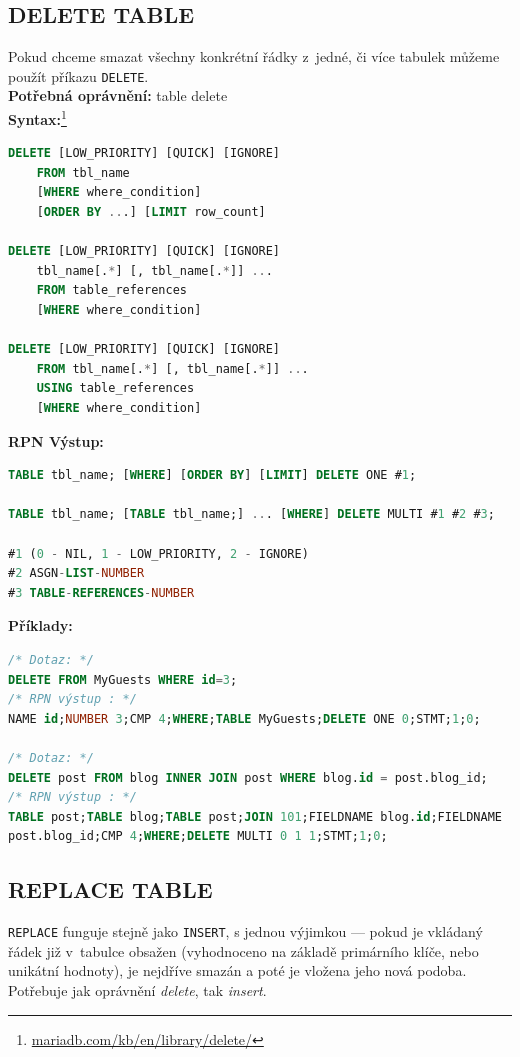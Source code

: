 \subsection{DELETE TABLE} \label{subsec:6:deletetbl}
Pokud chceme smazat všechny konkrétní řádky z~jedné, či více tabulek můžeme použít příkazu \texttt{DELETE}. \\

\textbf{Potřebná oprávnění:} table delete \\

\textbf{Syntax:}\footnote{\url{mariadb.com/kb/en/library/delete/}}
\begin{lstlisting}[language=sql]
DELETE [LOW_PRIORITY] [QUICK] [IGNORE] 
    FROM tbl_name 
    [WHERE where_condition]
    [ORDER BY ...] [LIMIT row_count]

DELETE [LOW_PRIORITY] [QUICK] [IGNORE]
    tbl_name[.*] [, tbl_name[.*]] ...
    FROM table_references
    [WHERE where_condition]

DELETE [LOW_PRIORITY] [QUICK] [IGNORE]
    FROM tbl_name[.*] [, tbl_name[.*]] ...
    USING table_references
    [WHERE where_condition]
\end{lstlisting}
\vspace*{\baselineskip}
\textbf{RPN Výstup:}
\begin{lstlisting}[language=sql]
TABLE tbl_name; [WHERE] [ORDER BY] [LIMIT] DELETE ONE #1;

TABLE tbl_name; [TABLE tbl_name;] ... [WHERE] DELETE MULTI #1 #2 #3;

#1 (0 - NIL, 1 - LOW_PRIORITY, 2 - IGNORE)
#2 ASGN-LIST-NUMBER
#3 TABLE-REFERENCES-NUMBER
\end{lstlisting}
\vspace*{\baselineskip}
\textbf{Příklady:}
\begin{lstlisting}[language=sql]
/* Dotaz: */
DELETE FROM MyGuests WHERE id=3;
/* RPN výstup : */
NAME id;NUMBER 3;CMP 4;WHERE;TABLE MyGuests;DELETE ONE 0;STMT;1;0;

/* Dotaz: */
DELETE post FROM blog INNER JOIN post WHERE blog.id = post.blog_id;
/* RPN výstup : */
TABLE post;TABLE blog;TABLE post;JOIN 101;FIELDNAME blog.id;FIELDNAME 
post.blog_id;CMP 4;WHERE;DELETE MULTI 0 1 1;STMT;1;0;
\end{lstlisting}

\subsection{REPLACE TABLE} \label{subsec:6:replacetbl}
\texttt{REPLACE} funguje stejně jako \texttt{INSERT}, s jednou výjimkou --- pokud je vkládaný řádek již v~tabulce obsažen
 (vyhodnoceno na základě primárního klíče, nebo unikátní hodnoty), je nejdříve smazán a poté je vložena jeho nová podoba. 
 Potřebuje jak oprávnění \textit{delete}, tak \textit{insert}. \\

